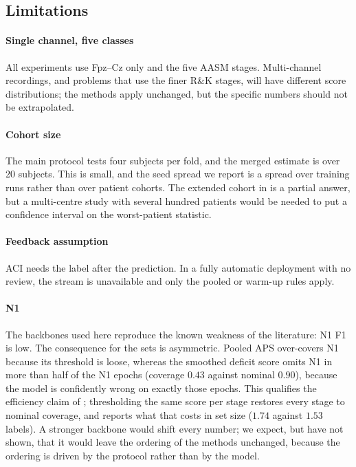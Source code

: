 \subsection{Limitations}
\label{sec:limitations}

\paragraph{Single channel, five classes}
All experiments use Fpz--Cz only and the five AASM stages. Multi-channel
recordings, and problems that use the finer R\&K stages, will have different
score distributions; the methods apply unchanged, but the specific numbers
should not be extrapolated.

\paragraph{Cohort size}
The main protocol tests four subjects per fold, and the merged estimate is
over 20 subjects. This is small, and the seed spread we report is a
spread over training runs rather than over patient cohorts. The extended
cohort in  is a partial answer, but a
multi-centre study with several hundred patients would be needed to put a
confidence interval on the worst-patient statistic.

\paragraph{Feedback assumption}
ACI needs the label after the prediction. In a fully automatic deployment
with no review, the stream is unavailable and only the pooled or warm-up
rules apply.

\paragraph{N1}
The backbones used here reproduce the known weakness of the literature: N1
F1 is low. The consequence for the sets is asymmetric. Pooled APS
over-covers N1 because its threshold is loose, whereas the smoothed deficit
score omits N1 in more than half of the N1 epochs (coverage $0.43$ against
nominal $0.90$), because the model is confidently wrong on exactly those
epochs. This qualifies the efficiency claim of ;
thresholding the same score per stage restores every stage to nominal
coverage, and  reports what that costs in set size
($1.74$ against $1.53$ labels). A stronger backbone would shift every number;
we expect, but have not shown, that it would leave the ordering of the methods
unchanged, because the ordering is driven by the protocol rather than by the
model.

